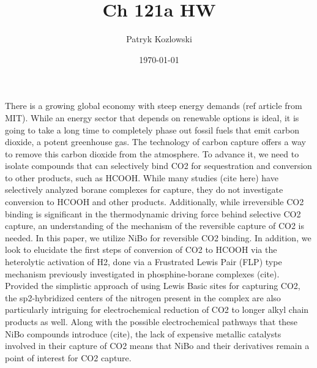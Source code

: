 \documentclass[12pt]{article}
\title{Ch 121a HW}
\author{Patryk Kozlowski}
\date{\today}
\begin{document}
\maketitle
There is a growing global economy with steep energy demands (ref article from MIT). While an energy sector that depends on renewable options is ideal, it is going to take a long time to completely phase out fossil fuels that emit carbon dioxide, a potent greenhouse gas. The technology of carbon capture offers a way to remove this carbon dioxide from the atmosphere. To advance it, we need to isolate compounds that can selectively bind CO2 for sequestration and conversion to other products, such as HCOOH. While many studies (cite here) have selectively analyzed borane complexes for capture, they do not investigate conversion to HCOOH and other products. Additionally, while irreversible CO2 binding is significant in the thermodynamic driving force behind selective CO2 capture, an understanding of the mechanism of the reversible capture of CO2 is needed. In this paper, we utilize NiBo for reversible CO2 binding. In addition, we look to elucidate the first steps of conversion of CO2 to HCOOH via the heterolytic activation of H2, done via a Frustrated Lewis Pair (FLP) type mechanism previously investigated in phosphine-borane complexes (cite). Provided the simplistic approach of using Lewis Basic sites for capturing CO2, the sp2-hybridized centers of the nitrogen present in the complex are also particularly intriguing for electrochemical reduction of CO2 to longer alkyl chain products as well. Along with the possible electrochemical pathways that these NiBo compounds introduce (cite), the lack of expensive metallic catalysts involved in their capture of CO2 means that NiBo and their derivatives remain a point of interest for CO2 capture.  
\end{document}
